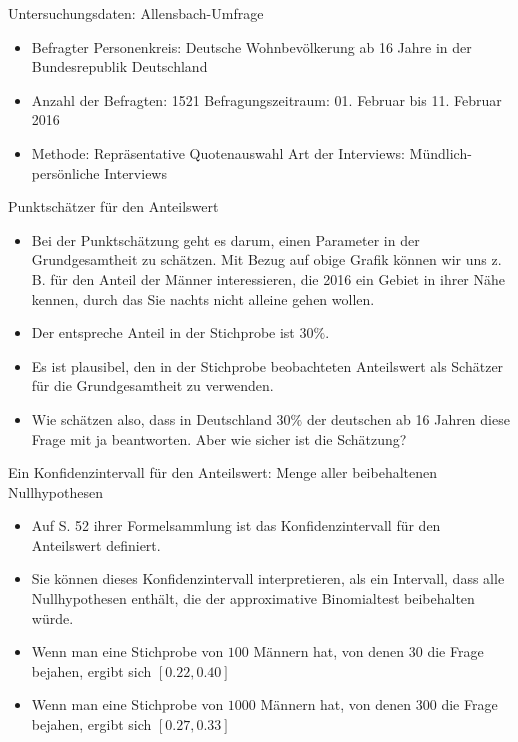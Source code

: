 \documentclass[usenames,dvipsnames,handout]{beamer}
\begin{document}
\begin{frame}{Untersuchungsdaten: Allensbach-Umfrage}
\begin{itemize}
\item{ 
Befragter Personenkreis:
Deutsche Wohnbevölkerung ab 16 Jahre in 
der Bundesrepublik Deutschland}
\item{Anzahl der Befragten:
1521
Befragungszeitraum:
01. Februar bis 11. Februar 2016}
\item{Methode:
Repräsentative Quotenauswahl
Art der Interviews:
Mündlich-persönliche Interviews}
\end{itemize}
\end{frame}

\begin{frame}{Punktschätzer für den Anteilswert}
\begin{itemize}
\item{Bei der Punktschätzung geht es darum, einen Parameter in der Grundgesamtheit
zu schätzen. Mit Bezug auf obige Grafik können wir uns z. B. für den Anteil der Männer
interessieren, die 2016 ein Gebiet in ihrer Nähe kennen, durch das Sie nachts nicht alleine gehen wollen.}
\item{Der entspreche Anteil in der Stichprobe ist $30\%.$}\pause
\item{Es ist plausibel, den in der Stichprobe beobachteten Anteilswert als Schätzer
für die Grundgesamtheit zu verwenden.}\pause
\item{Wie schätzen also, dass in Deutschland $30\%$ der deutschen ab 16 Jahren diese Frage mit 
ja beantworten. Aber wie sicher ist die Schätzung?}
\end{itemize}
\end{frame}
\begin{frame}{Ein Konfidenzintervall für den Anteilswert: Menge aller beibehaltenen Nullhypothesen}
\begin{itemize}
\item{Auf S. 52 ihrer Formelsammlung ist das Konfidenzintervall für den
Anteilswert definiert.}\pause
\item{Sie können dieses Konfidenzintervall interpretieren, als ein Intervall,
dass alle Nullhypothesen enthält, die der approximative Binomialtest beibehalten würde.}\pause
\item{Wenn man eine Stichprobe von  $100$ Männern hat, von denen $30$ die Frage bejahen, ergibt sich 
$[0.22,0.40]$ }\pause
\item{Wenn man eine Stichprobe von  $1000$ Männern hat, von denen $300$ die Frage bejahen, ergibt sich 
$[0.27,0.33]$ }
\end{itemize}
\end{frame}
\end{document}
